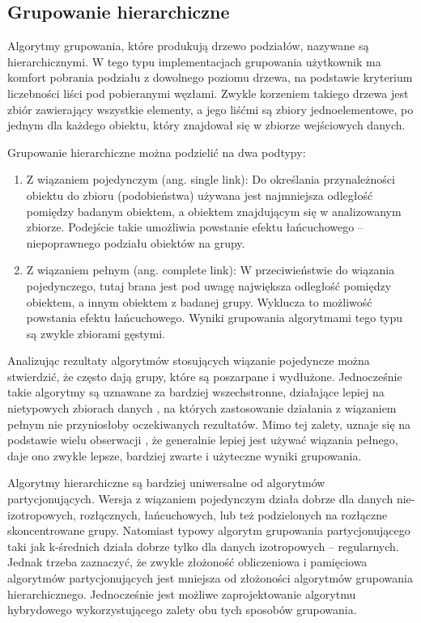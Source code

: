 \documentclass{article}
\begin{document}
\subsection{Grupowanie hierarchiczne} 
\label{subsec:grupHier}
Algorytmy grupowania, które produkują drzewo podziałów, nazywane są hierarchicznymi. W tego typu implementacjach grupowania użytkownik ma komfort pobrania podziału z dowolnego poziomu drzewa, na podstawie kryterium liczebności liści pod pobieranymi węzłami. Zwykle korzeniem takiego drzewa jest zbiór zawierający wszystkie elementy, a jego liśćmi są zbiory jednoelementowe, po jednym dla każdego obiektu, który znajdował się w zbiorze wejściowych danych.

Grupowanie hierarchiczne można podzielić na dwa podtypy:

\begin{enumerate}
	\item Z wiązaniem pojedynczym (ang. single link):
	Do określania przynależności obiektu do zbioru (podobieństwa) używana jest najmniejsza odległość pomiędzy badanym obiektem, a obiektem znajdującym się w analizowanym zbiorze. Podejście takie umożliwia powstanie efektu łańcuchowego – niepoprawnego podziału obiektów na grupy.
	\item Z wiązaniem pełnym (ang. complete link): 
	W przeciwieństwie do wiązania pojedynczego, tutaj brana jest pod uwagę największa odległość pomiędzy obiektem, a innym obiektem z badanej grupy. Wyklucza to możliwość powstania efektu łańcuchowego. Wyniki grupowania algorytmami tego typu są zwykle zbiorami gęstymi.
\end{enumerate}

Analizując rezultaty algorytmów stosujących wiązanie pojedyncze można stwierdzić, że często dają grupy, które są poszarpane i wydłużone. Jednocześnie takie algorytmy są uznawane za bardziej wszechstronne, działające lepiej na nietypowych zbiorach danych , na których zastosowanie działania z wiązaniem pełnym nie przyniosłoby oczekiwanych rezultatów. Mimo tej zalety, uznaje się na podstawie wielu obserwacji , że generalnie lepiej jest używać wiązania pełnego, daje ono zwykle lepsze, bardziej zwarte i użyteczne wyniki grupowania.

Algorytmy hierarchiczne są bardziej uniwersalne od algorytmów partycjonujących. Wersja z wiązaniem pojedynczym działa dobrze dla danych nie-izotropowych, rozłącznych, łańcuchowych, lub też podzielonych na rozłączne skoncentrowane grupy. Natomiast typowy algorytm grupowania partycjonującego taki jak k-średnich działa dobrze tylko dla danych izotropowych – regularnych. Jednak trzeba zaznaczyć, że zwykle złożoność obliczeniowa i pamięciowa algorytmów partycjonujących jest mniejsza od złożoności algorytmów grupowania hierarchicznego. Jednocześnie jest możliwe zaprojektowanie algorytmu hybrydowego wykorzystującego zalety obu tych sposobów grupowania. 
\end{document}
